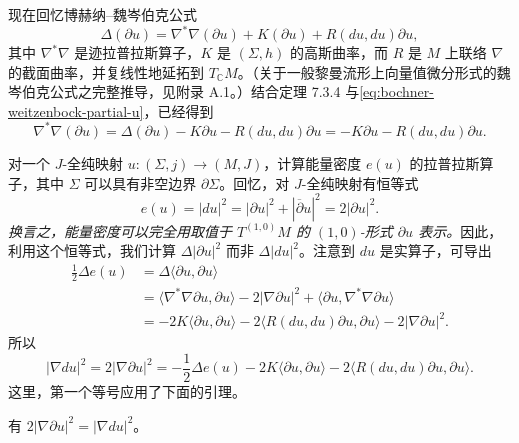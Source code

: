 现在回忆博赫纳--魏岑伯克公式
\begin{equation}
 \Delta(\partial u)
 =\nabla^*\nabla(\partial u)+K(\partial u)+R(du,du)\partial u,
 \label{eq:bochner-weitzenbock-partial-u}
\end{equation}
其中 $\nabla^*\nabla$ 是迹拉普拉斯算子，$K$ 是 $(\Sigma,h)$ 的高斯曲率，而 $R$ 是 $M$ 上联络 $\nabla$ 的截面曲率，并复线性地延拓到 $T_{\mathbb C}M$。（关于一般黎曼流形上向量值微分形式的魏岑伯克公式之完整推导，见附录 A.1。）结合定理 7.3.4 与\eqref{eq:bochner-weitzenbock-partial-u}，已经得到
\begin{equation}
 \nabla^*\nabla(\partial u)
 =\Delta(\partial u)-K\partial u-R(du,du)\partial u
 =-K\partial u-R(du,du)\partial u.
 \label{eq:trace-laplacian-partial-u}
\end{equation}

对一个 $J$-全纯映射 $u:(\Sigma,j)\to(M,J)$，计算能量密度 $e(u)$ 的拉普拉斯算子，其中 $\Sigma$ 可以具有非空边界 $\partial\Sigma$。回忆，对 $J$-全纯映射有恒等式
\[
 e(u)=|du|^2=|\partial u|^2+|\overline\partial u|^2=2|\partial u|^2.
\]
\emph{换言之，能量密度可以完全用取值于 $T^{(1,0)}M$ 的 $(1,0)$-形式 $\partial u$ 表示。}因此，利用这个恒等式，我们计算 $\Delta|\partial u|^2$ 而非 $\Delta|du|^2$。注意到 $du$ 是实算子，可导出
\begin{equation}
\begin{split}
 \frac12\Delta e(u)
 &=\Delta\langle\partial u,\partial u\rangle\\
 &=\langle\nabla^*\nabla\partial u,\partial u\rangle
 -2|\nabla\partial u|^2
 +\langle\partial u,\nabla^*\nabla\partial u\rangle\\
 &=-2K\langle\partial u,\partial u\rangle
 -2\langle R(du,du)\partial u,\partial u\rangle
 -2|\nabla\partial u|^2.
\end{split}
 \label{eq:laplacian-energy-density}
\end{equation}
所以
\begin{equation}
 |\nabla du|^2=2|\nabla\partial u|^2
 =-\frac12\Delta e(u)
 -2K\langle\partial u,\partial u\rangle
 -2\langle R(du,du)\partial u,\partial u\rangle.
 \label{eq:nabla-du-energy-density}
\end{equation}
这里，第一个等号应用了下面的引理。

\begin{lemma}\label{lem:nabla-du-partial-u-norm}
有 $2|\nabla\partial u|^2=|\nabla du|^2$。
\end{lemma}

